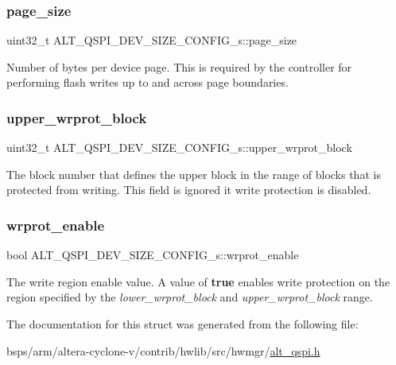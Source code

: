 \subsubsection{\texorpdfstring{page\_size}{page\_size}}
{\footnotesize\ttfamily uint32\+\_\+t A\+L\+T\+\_\+\+Q\+S\+P\+I\+\_\+\+D\+E\+V\+\_\+\+S\+I\+Z\+E\+\_\+\+C\+O\+N\+F\+I\+G\+\_\+s\+::page\+\_\+size}

Number of bytes per device page. This is required by the controller for performing flash writes up to and across page boundaries. \mbox{\label{structALT__QSPI__DEV__SIZE__CONFIG__s_a2c554e5af4f4e2c365c08797fc3e8c67}} 
\subsubsection{\texorpdfstring{upper\_wrprot\_block}{upper\_wrprot\_block}}
{\footnotesize\ttfamily uint32\+\_\+t A\+L\+T\+\_\+\+Q\+S\+P\+I\+\_\+\+D\+E\+V\+\_\+\+S\+I\+Z\+E\+\_\+\+C\+O\+N\+F\+I\+G\+\_\+s\+::upper\+\_\+wrprot\+\_\+block}

The block number that defines the upper block in the range of blocks that is protected from writing. This field is ignored it write protection is disabled. \mbox{\label{structALT__QSPI__DEV__SIZE__CONFIG__s_a58b821b3c936320647b0ab87fb356d9a}} 
\subsubsection{\texorpdfstring{wrprot\_enable}{wrprot\_enable}}
{\footnotesize\ttfamily bool A\+L\+T\+\_\+\+Q\+S\+P\+I\+\_\+\+D\+E\+V\+\_\+\+S\+I\+Z\+E\+\_\+\+C\+O\+N\+F\+I\+G\+\_\+s\+::wrprot\+\_\+enable}

The write region enable value. A value of {\bfseries{true}} enables write protection on the region specified by the {\itshape lower\+\_\+wrprot\+\_\+block} and {\itshape upper\+\_\+wrprot\+\_\+block} range. 

The documentation for this struct was generated from the following file\+:\begin{DoxyCompactItemize}
\item 
bsps/arm/altera-\/cyclone-\/v/contrib/hwlib/src/hwmgr/\mbox{\hyperlink{contrib_2hwlib_2src_2hwmgr_2alt__qspi_8h}{alt\+\_\+qspi.\+h}}\end{DoxyCompactItemize}
